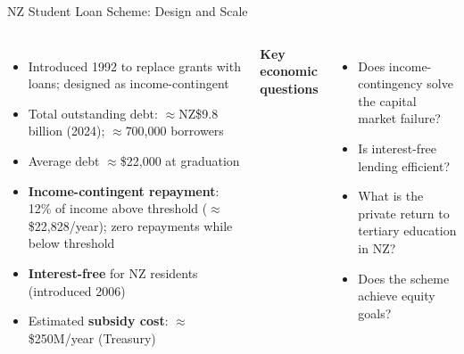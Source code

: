 \documentclass[aspectratio=169, 12pt]{beamer}
\begin{document}
\begin{frame}{NZ Student Loan Scheme: Design and Scale}
  \begin{columns}
      \footnotesize
      \begin{itemize}
        \item Introduced 1992 to replace grants with loans; designed as income-contingent
        \item Total outstanding debt: $\approx$NZ\$9.8 billion (2024); $\approx$700,000 borrowers
        \item Average debt $\approx$\$22,000 at graduation
        \item \textbf{Income-contingent repayment}: 12\% of income above threshold
              ($\approx$\$22,828/year); zero repayments while below threshold
        \item \textbf{Interest-free} for NZ residents (introduced 2006)
        \item Estimated \textbf{subsidy cost}: $\approx$\$250M/year (Treasury)
      \end{itemize}
      \footnotesize \textbf{Key economic questions}
      \begin{itemize}
        \item Does income-contingency solve the capital market failure?
        \item Is interest-free lending efficient?
        \item What is the private return to tertiary education in NZ?
        \item Does the scheme achieve equity goals?
      \end{itemize}
  \end{columns}
\end{frame}
\end{document}

